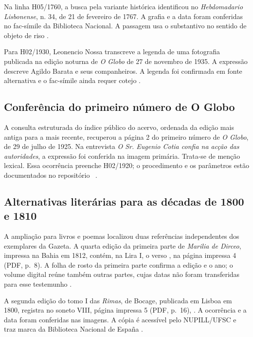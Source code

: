 Na linha H05/1760, a busca pela variante histórica  identificou  no \textit{Hebdomadario Lisbonense}, n. 34, de 21 de fevereiro de 1767. A grafia e a data foram conferidas no fac-símile da Biblioteca Nacional. A passagem usa o substantivo no sentido de objeto de riso \cite{acervoD133}.

Para H02/1930, Leonencio Nossa transcreve a legenda de uma fotografia publicada na edição noturna de \textit{O Globo} de 27 de novembro de 1935. A expressão  descreve Agildo Barata e seus companheiros. A legenda foi confirmada em fonte alternativa e o fac-símile ainda requer cotejo \cite{acervoD134}.

\subsection{Conferência do primeiro número de O Globo}
A consulta estruturada do índice público do acervo, ordenada da edição mais antiga para a mais recente, recuperou a página 2 do primeiro número de \textit{O Globo}, de 29 de julho de 1925. Na entrevista \textit{O Sr. Eugenio Cotia confia na acção das autoridades}, a expressão  foi conferida na imagem primária. Trata-se de menção lexical. Essa ocorrência preenche H02/1920; o procedimento e os parâmetros estão documentados no repositório \repo\ \cite{acervoD135}.

\subsection{Alternativas literárias para as décadas de 1800 e 1810}

A ampliação para livros e poemas localizou duas referências independentes dos exemplares da Gazeta. A quarta edição da primeira parte de \textit{Marilia de Dirceo}, impressa na Bahia em 1812, contém, na Lira I, o verso , na página impressa 4 (PDF, p.~8). A folha de rosto da primeira parte confirma a edição e o ano; o volume digital reúne também outras partes, cujas datas não foram transferidas para esse testemunho \cite{altGonzaga1812}.

A segunda edição do tomo I das \textit{Rimas}, de Bocage, publicada em Lisboa em 1800, registra no soneto VIII, página impressa 5 (PDF, p.~16), . A ocorrência e a data foram conferidas nas imagens. A cópia é acessível pelo NUPILL/UFSC e traz marca da Biblioteca Nacional de España \cite{altBocage1800}.

